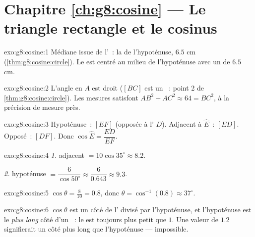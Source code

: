 \section*{Chapitre \ref{ch:g8:cosine} --- Le triangle rectangle et le cosinus}

\begin{solution}{exo:g8:cosine:1}
Médiane issue de l'~: la  de l'hypoténuse, $6.5$ cm
(\cref{thm:g8:cosine:circle}). Le  est centré au
milieu de l'hypoténuse avec un  de $6.5$ cm.
\end{solution}

\begin{solution}{exo:g8:cosine:2}
L'angle en $A$ est droit ($[BC]$ est un ~: point 2 de
\cref{thm:g8:cosine:circle}). Les mesures satisfont
$AB^2 + AC^2 \approx 64 = BC^2$, à la précision de mesure près.
\end{solution}

\begin{solution}{exo:g8:cosine:3}
Hypoténuse~: $[EF]$ (opposée à l' $D$). Adjacent à
$\widehat E$~: $[ED]$. Opposé~: $[DF]$. Donc
$\cos\widehat E = \dfrac{ED}{EF}$.
\end{solution}

\begin{solution}{exo:g8:cosine:4}
\emph{1.} adjacent $= 10 \cos 35^\circ \approx 8.2$.

\emph{2.} hypoténuse $= \dfrac{6}{\cos 50^\circ} \approx
\dfrac{6}{0.643} \approx 9.3$.
\end{solution}

\begin{solution}{exo:g8:cosine:5}
$\cos\theta = \frac{8}{10} = 0.8$, donc
$\theta = \cos^{-1}(0.8) \approx 37^\circ$.
\end{solution}

\begin{solution}{exo:g8:cosine:6}
$\cos\theta$ est un côté de l' divisé par l'hypoténuse, et
l'hypoténuse est le \emph{plus long} côté d'un ~: le
 est toujours plus petit que $1$. Une valeur de $1.2$
signifierait un côté plus long que l'hypoténuse --- impossible.
\end{solution}

